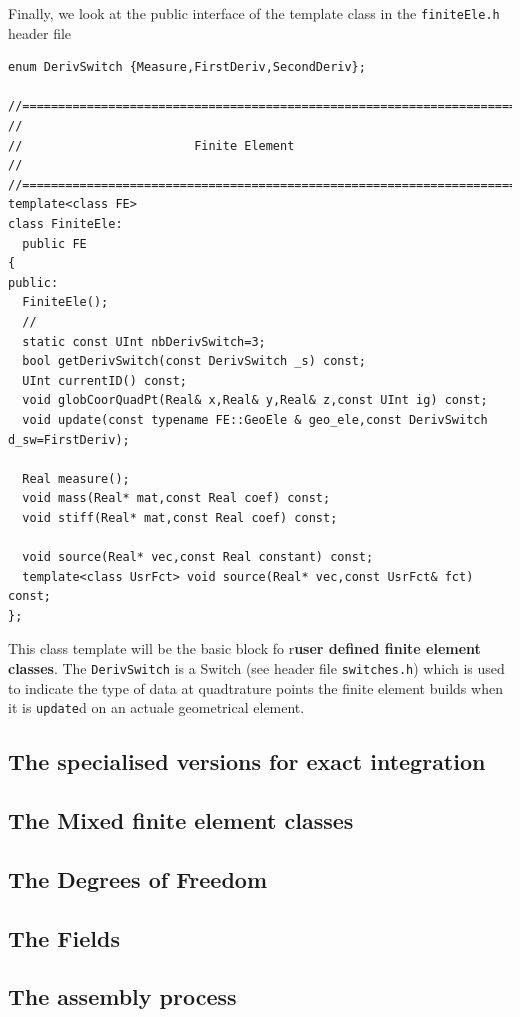 Finally, we look at the public interface of the template class in the \texttt{finiteEle.h}
header file
\begin{verbatim}
enum DerivSwitch {Measure,FirstDeriv,SecondDeriv};

//======================================================================
//
//                        Finite Element
//
//======================================================================
template<class FE>
class FiniteEle: 
  public FE
{
public:
  FiniteEle();
  //
  static const UInt nbDerivSwitch=3;
  bool getDerivSwitch(const DerivSwitch _s) const;  
  UInt currentID() const;
  void globCoorQuadPt(Real& x,Real& y,Real& z,const UInt ig) const;
  void update(const typename FE::GeoEle & geo_ele,const DerivSwitch d_sw=FirstDeriv);

  Real measure();
  void mass(Real* mat,const Real coef) const;
  void stiff(Real* mat,const Real coef) const;

  void source(Real* vec,const Real constant) const;
  template<class UsrFct> void source(Real* vec,const UsrFct& fct) const;
};
\end{verbatim}
This class template will be the basic block fo r\textbf{user defined
  finite element classes}. The \texttt{DerivSwitch} is a Switch (see
header file \texttt{switches.h}) which is used to indicate the 
type of data at quadtrature points the finite element builds when
it is \texttt{update}d on an actuale geometrical element.

\subsection{The specialised versions for exact integration}
\subsection{The Mixed finite element classes}

\subsection{The Degrees of Freedom}
\label{s:dof}
\subsection{The Fields}
\subsection{The assembly process}

%
%
